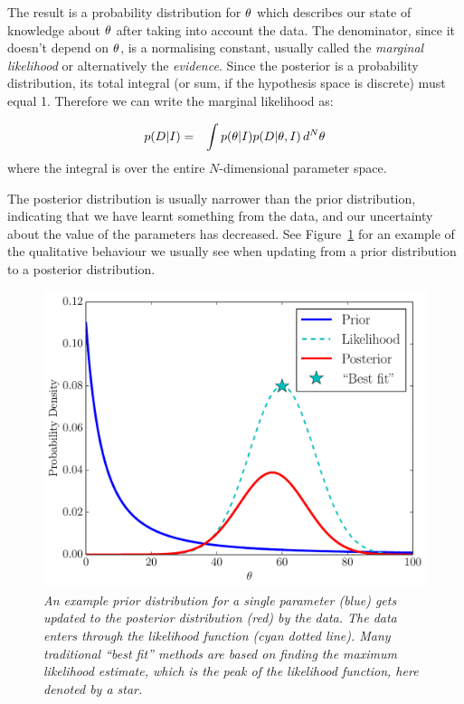 The result is a probability distribution for $\theta$ which describes
our state of knowledge about $\theta$ after taking into account the data.
The denominator, since it doesn't depend on $\theta$, is a normalising
constant, usually called the {\it marginal likelihood} or alternatively the
{\it evidence}. Since the posterior is a probability distribution, its
total integral (or sum, if the
hypothesis space is discrete) must equal 1. Therefore we can write the
marginal likelihood as:

\begin{eqnarray}
p(D | I) &=& \int p(\theta | I)p(D | \theta, I) \, d^N \theta
\end{eqnarray}
where the integral is over the entire $N$-dimensional parameter space.

The posterior distribution is usually narrower than the prior distribution,
indicating that we have learnt something from the data, and our uncertainty
about the value of the parameters has decreased. See
Figure~\ref{fig:bayes} for an example of the qualitative behaviour we usually
see when updating from a prior distribution to a posterior distribution.

\begin{figure}
\begin{center}
\includegraphics[scale=0.45]{bayes.pdf}
\caption{\it An example prior distribution for a single parameter (blue)
gets updated to the posterior distribution (red) by the data. The data
enters through the likelihood function (cyan dotted line). Many traditional
``best fit'' methods are based on finding the {\it maximum likelihood}
estimate, which is the peak of the likelihood function, here denoted by a
star.
\label{fig:bayes}}
\end{center}
\end{figure}

